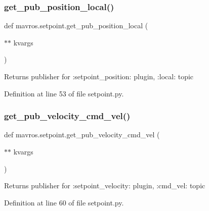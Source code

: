 \subsubsection{\texorpdfstring{get\_pub\_position\_local()}{get\_pub\_position\_local()}}
{\footnotesize\ttfamily def mavros.\+setpoint.\+get\+\_\+pub\+\_\+position\+\_\+local (\begin{DoxyParamCaption}\item[{$\ast$$\ast$}]{kvargs }\end{DoxyParamCaption})}

\begin{DoxyVerb}Returns publisher for :setpoint_position: plugin, :local: topic
\end{DoxyVerb}
 

Definition at line 53 of file setpoint.\+py.

\mbox{\label{namespacemavros_1_1setpoint_aaa93a3bb0bc2030ec26a047440eed7b3}} 
\subsubsection{\texorpdfstring{get\_pub\_velocity\_cmd\_vel()}{get\_pub\_velocity\_cmd\_vel()}}
{\footnotesize\ttfamily def mavros.\+setpoint.\+get\+\_\+pub\+\_\+velocity\+\_\+cmd\+\_\+vel (\begin{DoxyParamCaption}\item[{$\ast$$\ast$}]{kvargs }\end{DoxyParamCaption})}

\begin{DoxyVerb}Returns publisher for :setpoint_velocity: plugin, :cmd_vel: topic
\end{DoxyVerb}
 

Definition at line 60 of file setpoint.\+py.

